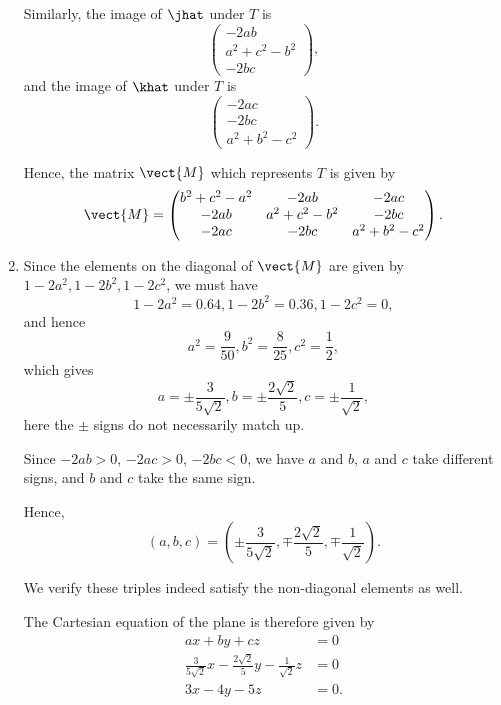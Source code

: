 \begin{enumerate}
          Similarly, the image of \(\jhat\) under \(T\) is
          \[
              \begin{pmatrix}
                  -2ab            \\
                  a^2 + c^2 - b^2 \\
                  -2bc
              \end{pmatrix},
          \]
          and the image of \(\khat\) under \(T\) is
          \[
              \begin{pmatrix}
                  -2ac \\
                  -2bc \\
                  a^2 + b^2 - c^2
              \end{pmatrix}.
          \]

          Hence, the matrix \(\vect{M}\) which represents \(T\) is given by
          \[
              \vect{M} = \begin{pmatrix}
                  b^2 + c^2 - a^2 & -2ab            & -2ac            \\
                  -2ab            & a^2 + c^2 - b^2 & -2bc            \\
                  -2ac            & -2bc            & a^2 + b^2 - c^2
              \end{pmatrix}.
          \]

    \item Since the elements on the diagonal of \(\vect{M}\) are given by \(1 - 2a^2, 1 - 2b^2, 1 - 2c^2\), we must have
          \[
              1 - 2a^2 = 0.64, 1 - 2b^2 = 0.36, 1 - 2c^2 = 0,
          \]
          and hence
          \[
              a^2 = \frac{9}{50}, b^2 = \frac{8}{25}, c^2 = \frac{1}{2},
          \]
          which gives
          \[
              a = \pm \frac{3}{5\sqrt{2}}, b = \pm \frac{2 \sqrt{2}}{5}, c = \pm \frac{1}{\sqrt{2}},
          \]
          here the \(\pm\) signs do not necessarily match up.

          Since \(-2ab > 0\), \(-2ac > 0\), \(-2bc < 0\), we have \(a\) and \(b\), \(a\) and \(c\) take different signs, and \(b\) and \(c\) take the same sign.

          Hence,
          \[
              (a, b, c) = \left(\pm \frac{3}{5 \sqrt{2}}, \mp \frac{2 \sqrt{2}}{5}, \mp \frac{1}{\sqrt{2}}\right).
          \]

          We verify these triples indeed satisfy the non-diagonal elements as well.

          The Cartesian equation of the plane is therefore given by
          \begin{align*}
              ax + by + cz                                                        & = 0  \\
              \frac{3}{5 \sqrt{2}}x - \frac{2 \sqrt{2}}{5}y - \frac{1}{\sqrt{2}}z & = 0  \\
              3x - 4y - 5z                                                        & = 0.
          \end{align*}


\end{enumerate}
